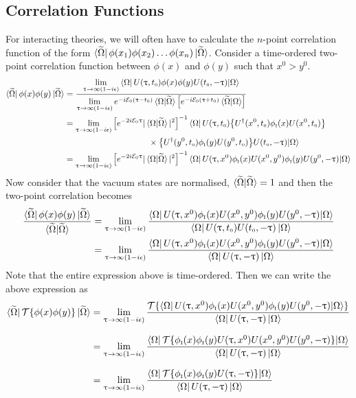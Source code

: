 \subsection{Correlation Functions}
For interacting theories, we will often have to calculate the $n$-point correlation function of the form $\bra{\widetilde{\Omega}} \phi(x_1)\phi(x_2)\ldots \phi(x_n) \ket{\widetilde{\Omega}}$. Consider a time-ordered two-point correlation function between $\phi(x)$ and $\phi(y)$ such that $x^0>y^0$. 
\begin{align*}
    \bra{\widetilde{\Omega}} \phi(x)\phi(y) \ket{\widetilde{\Omega}} &=
    \frac{\lim\limits_{\uptau \to \infty(1-i\epsilon)}  \bra{\Omega} U(\uptau,{t_{\text{\tiny 0}}})\phi(x)\phi(y)U ({t_{\text{\tiny 0}}}, -\uptau) {\ket{\Omega}} }{\lim\limits_{\uptau \to \infty(1-i\epsilon)}   e^{-i\mathcal E_{\text{\tiny 0}}(\uptau-{t_{\text{\tiny 0}}})} \braket{\Omega|\widetilde{\Omega}}\qty[e^{-i\mathcal E_{\text{\tiny 0}}(\uptau+{t_{\text{\tiny 0}}})} \braket{\widetilde{\Omega}|\Omega}] }\\
    &={\lim\limits_{\uptau \to \infty(1-i\epsilon)}  \qty[ e^{-2i\mathcal E_{\text{\tiny 0}}\uptau} |\braket{\Omega|\widetilde{\Omega}}|^2] }^{-1}  \bra{\Omega} U(\uptau,{t_{\text{\tiny 0}}})\qty{U^\dagger(x^0, {t_{\text{\tiny 0}}})\phi_{\text{\tiny I}}(x)U(x^0, {t_{\text{\tiny 0}}})}\\ &\qquad\qquad\qquad\qquad\qquad\times \qty{U^\dagger(y^0, {t_{\text{\tiny 0}}})\phi_{\text{\tiny I}}(y)U(y^0, {t_{\text{\tiny 0}}})}U ({t_{\text{\tiny 0}}}, -\uptau) {\ket{\Omega}} \\
    &={\lim\limits_{\uptau \to \infty(1-i\epsilon)}  \qty[ e^{-2i\mathcal E_{\text{\tiny 0}}\uptau} |\braket{\Omega|\widetilde{\Omega}}|^2] }^{-1}  \bra{\Omega} U(\uptau,x^0)\phi_{\text{\tiny I}}(x)U(x^0, y^0) \phi_{\text{\tiny I}}(y)U(y^0, -\uptau) {\ket{\Omega}}
\end{align*}
Now consider that the vacuum states are normalised, $\braket{\widetilde{\Omega}|\widetilde{\Omega}} =1$ and then the two-point correlation becomes 
\begin{align*}
    \frac{ \bra{\widetilde{\Omega}} \phi(x)\phi(y) \ket{\widetilde{\Omega}}}{\braket{\widetilde{\Omega}|\widetilde{\Omega}}} &= \lim\limits_{\uptau \to \infty(1-i\epsilon)}\frac{\bra{\Omega} U(\uptau,x^0)\phi_{\text{\tiny I}}(x)U(x^0, y^0) \phi_{\text{\tiny I}}(y)U(y^0, -\uptau) {\ket{\Omega}}}{\bra{\Omega} U(\uptau, {t_{\text{\tiny 0}}}) U({t_{\text{\tiny 0}}}, -\uptau)\ket{\Omega}}\\
    &=\lim\limits_{\uptau \to \infty(1-i\epsilon)}\frac{\bra{\Omega} U(\uptau,x^0)\phi_{\text{\tiny I}}(x)U(x^0, y^0) \phi_{\text{\tiny I}}(y)U(y^0, -\uptau) {\ket{\Omega}}}{\bra{\Omega} U(\uptau,-\uptau )\ket{\Omega}}
\end{align*}
Note that the entire expression above is time-ordered. Then we can write the above expression as 
\begin{align*}
     { \bra{\widetilde{\Omega}}\mathcal T\{\phi(x)\phi(y)\} \ket{\widetilde{\Omega}}} &= \lim\limits_{\uptau \to \infty(1-i\epsilon)}\frac{\mathcal T\{\bra{\Omega} U(\uptau,x^0)\phi_{\text{\tiny I}}(x)U(x^0, y^0) \phi_{\text{\tiny I}}(y)U(y^0, -\uptau) {\ket{\Omega}}\}}{\bra{\Omega} U(\uptau,  -\uptau)\ket{\Omega}}\\[0.25cm]
     &=\lim\limits_{\uptau \to \infty(1-i\epsilon)}\frac{\bra{\Omega}\mathcal T\{ \phi_{\text{\tiny I}}(x) \phi_{\text{\tiny I}}(y) U(\uptau,x^0)U(x^0, y^0)U(y^0, -\uptau)  \}{\ket{\Omega}}}{\bra{\Omega} U(\uptau, -\uptau)\ket{\Omega}}\\[0.25cm]
     &=\lim\limits_{\uptau \to \infty(1-i\epsilon)}\frac{\bra{\Omega}\mathcal T\{ \phi_{\text{\tiny I}}(x) \phi_{\text{\tiny I}}(y) U(\uptau, -\uptau)  \}{\ket{\Omega}}}{\bra{\Omega} U(\uptau, -\uptau)\ket{\Omega}}
\end{align*}
